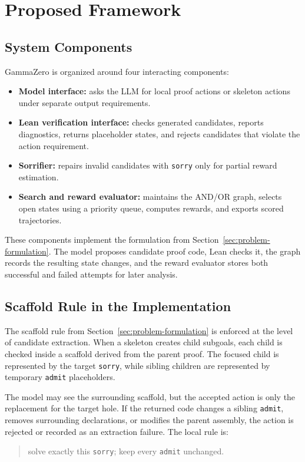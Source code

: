 \chapter{Proposed Framework}
\label{sec:framework}

\section{System Components}

GammaZero is organized around four interacting components:
\begin{itemize}
    \item \textbf{Model interface:} asks the LLM for local proof actions or skeleton actions under separate output requirements.
    \item \textbf{Lean verification interface:} checks generated candidates, reports diagnostics, returns placeholder states, and rejects candidates that violate the action requirement.
    \item \textbf{Sorrifier:} repairs invalid candidates with \texttt{sorry} only for partial reward estimation.
    \item \textbf{Search and reward evaluator:} maintains the AND/OR graph, selects open states using a priority queue, computes rewards, and exports scored trajectories.
\end{itemize}

These components implement the formulation from Section~\ref{sec:problem-formulation}. The model proposes candidate proof code, Lean checks it, the graph records the resulting state changes, and the reward evaluator stores both successful and failed attempts for later analysis.

\section{Scaffold Rule in the Implementation}

The scaffold rule from Section~\ref{sec:problem-formulation} is enforced at the level of candidate extraction. When a skeleton creates child subgoals, each child is checked inside a scaffold derived from the parent proof. The focused child is represented by the target \texttt{sorry}, while sibling children are represented by temporary \texttt{admit} placeholders.

The model may see the surrounding scaffold, but the accepted action is only the replacement for the target hole. If the returned code changes a sibling \texttt{admit}, removes surrounding declarations, or modifies the parent assembly, the action is rejected or recorded as an extraction failure. The local rule is:
\begin{quote}
solve exactly this \texttt{sorry}; keep every \texttt{admit} unchanged.
\end{quote}

